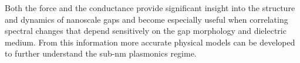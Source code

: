 \documentclass{book}
\begin{document}

Both the force and the conductance provide significant insight into the structure and dynamics of nanoscale gaps and become especially useful when correlating spectral changes that depend sensitively on the gap morphology and dielectric medium. From this information more accurate physical models can be developed to further understand the sub-nm plasmonics regime.
\end{document}
